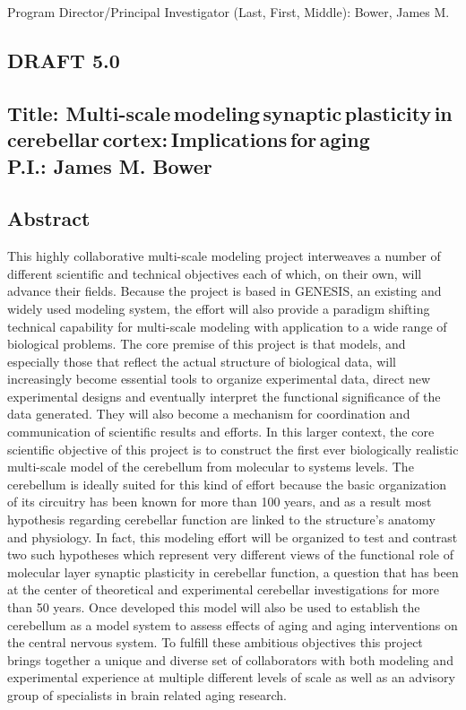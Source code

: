 \documentclass[12pt]{article}
\begin{document}
\noindent Program Director/Principal Investigator (Last, First, Middle): Bower, James M.

\subsection*{DRAFT 5.0}

\subsection*{Title: Multi-scale\,modeling\,synaptic\,plasticity\,in\,cerebellar\,cortex:\,Implications\,for\,aging\\P.I.: James M. Bower}

\subsection*{Abstract}

\noindent This highly collaborative multi-scale modeling project interweaves a number of different scientific and technical objectives each of which, on their own, will advance their fields. Because the project is based in GENESIS, an existing and widely used modeling system, the effort will also provide a paradigm shifting technical capability for multi-scale modeling with application to a wide range of biological problems. The core premise of this project is that models, and especially those that reflect the actual structure of biological data, will increasingly become essential tools to organize experimental data, direct new experimental designs and eventually interpret the functional significance of the data generated. They will also become a mechanism for coordination and communication of scientific results and efforts. In this larger context, the core scientific objective of this project is to construct the first ever biologically realistic multi-scale model of the cerebellum from molecular to systems levels. The cerebellum is ideally suited for this kind of effort because the basic organization of its circuitry has been known for more than 100 years, and as a result most hypothesis regarding cerebellar function are linked to the structure's anatomy and physiology. In fact, this modeling effort will be organized to test and contrast two such hypotheses which represent very different views of the functional role of molecular layer synaptic plasticity in cerebellar function, a question that has been at the center of theoretical and experimental cerebellar investigations for more than 50 years. Once developed this model will also be used to establish the cerebellum as a model system to assess effects of aging and aging interventions on the central nervous system. To fulfill these ambitious objectives this project brings together a unique and diverse set of collaborators with both modeling and experimental experience at multiple different levels of scale as well as an advisory group of specialists in brain related aging research.
\end{document}
